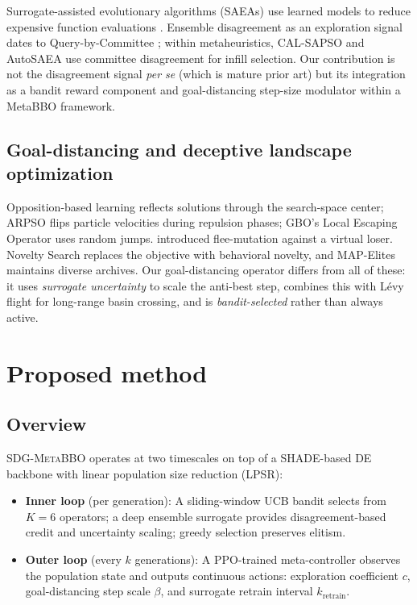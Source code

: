 \documentclass[preprint,12pt,number]{elsarticle}
\newcommand{\sdg}{\textsc{SDG-MetaBBO}}
\begin{document}
Surrogate-assisted evolutionary algorithms (SAEAs) use learned models to reduce expensive function evaluations \cite{He2023review}. Ensemble disagreement as an exploration signal dates to Query-by-Committee \cite{Seung1992}; within metaheuristics, CAL-SAPSO \cite{Wang2017} and AutoSAEA \cite{Xie2023} use committee disagreement for infill selection. Our contribution is not the disagreement signal \emph{per se} (which is mature prior art) but its integration as a bandit reward component and goal-distancing step-size modulator within a MetaBBO framework.

\subsection{Goal-distancing and deceptive landscape optimization}

Opposition-based learning \cite{Tizhoosh2005} reflects solutions through the search-space center; ARPSO \cite{Riget2002} flips particle velocities during repulsion phases; GBO's Local Escaping Operator \cite{Ahmadianfar2020} uses random jumps. \cite{Sebag2006} introduced flee-mutation against a virtual loser. Novelty Search \cite{Lehman2011} replaces the objective with behavioral novelty, and MAP-Elites \cite{Mouret2015} maintains diverse archives. Our goal-distancing operator differs from all of these: it uses \emph{surrogate uncertainty} to scale the anti-best step, combines this with L\'evy flight for long-range basin crossing, and is \emph{bandit-selected} rather than always active.

\section{Proposed method}
\label{sec:method}

\subsection{Overview}

\sdg{} operates at two timescales on top of a SHADE-based DE backbone \cite{Tanabe2014} with linear population size reduction (LPSR):

\begin{itemize}
\item \textbf{Inner loop} (per generation): A sliding-window UCB bandit selects from $K = 6$ operators; a deep ensemble surrogate provides disagreement-based credit and uncertainty scaling; greedy selection preserves elitism.
\item \textbf{Outer loop} (every $k$ generations): A PPO-trained meta-controller observes the population state and outputs continuous actions: exploration coefficient $c$, goal-distancing step scale $\beta$, and surrogate retrain interval $k_{\text{retrain}}$.
\end{itemize}
\end{document}
